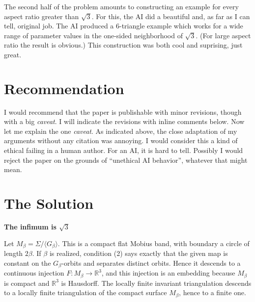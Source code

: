 \documentclass[12pt]{article}
\newcommand{\R}{\mathbb R}
\begin{document}
The second half of the problem amounts to constructing an example for every aspect ratio greater than $\sqrt 3$.  For this, the AI did a beautiful and,
as far as I can tell, original job. The AI produced a $6$-triangle example which works for a wide range of parameter values in the one-sided neighborhood of $\sqrt 3$.   (For large aspect ratio the result is obvious.) This construction was both cool and suprising, just great.







\section{Recommendation}


I would recommend that the paper is publishable with minor revisions, though with a big {\it caveat\/}.  I will indicate the revisions with inline comments below.
Now let me explain the one {\it caveat\/}.  As indicated above, the close adaptation of my arguments without any citation was annoying.  I would consider this a kind of ethical failing in a human author.  For an AI, it is hard to tell. 
Possibly I would reject the paper on the grounds of ``unethical AI behavior'', whatever that might mean.


\section{The Solution}




\date{}


\begin{center}
{\bf The infimum is \(\sqrt3\)}
\end{center}

Let \(M_\beta=\Sigma/\langle G_\beta\rangle\).  This is a compact flat
Mobius band, with boundary a circle of length \(2\beta\).  If \(\beta\)
is realized, condition (2) says exactly that the given map is constant on
the \(G_\beta\)-orbits and separates distinct orbits.  Hence it descends
to a continuous injection \(F:M_\beta\to\R^3\), and this injection is an
embedding because \(M_\beta\) is compact and \(\R^3\) is Hausdorff.  The
locally finite invariant triangulation descends to a locally finite
triangulation of the compact surface \(M_\beta\), hence to a finite one.
\end{document}
